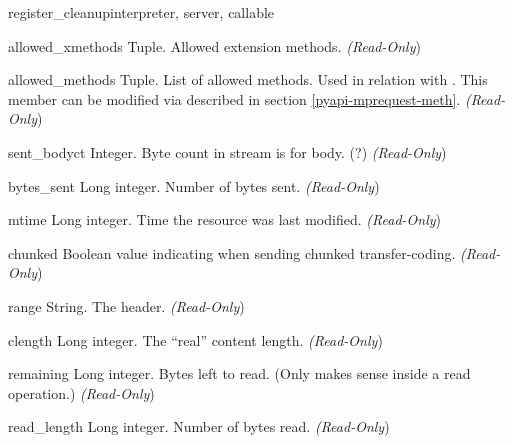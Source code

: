 \begin{funcdesc}{register_cleanup}{interpreter, server, callable}
\begin{memberdesc}[request]{allowed_xmethods}
  Tuple. Allowed extension methods.
  \emph{(Read-Only})
\end{memberdesc}

\begin{memberdesc}[request]{allowed_methods}
  Tuple. List of allowed methods. Used in relation with
  . This member can be modified via  
  described in section \ref{pyapi-mprequest-meth}.
  \emph{(Read-Only})
\end{memberdesc}

\begin{memberdesc}[request]{sent_bodyct}
  Integer. Byte count in stream is for body. (?)
  \emph{(Read-Only})
\end{memberdesc}

\begin{memberdesc}[request]{bytes_sent}
  Long integer. Number of bytes sent.
  \emph{(Read-Only})
\end{memberdesc}

\begin{memberdesc}[request]{mtime}
  Long integer. Time the resource was last modified.
  \emph{(Read-Only})
\end{memberdesc}

\begin{memberdesc}[request]{chunked}
  Boolean value indicating when sending chunked transfer-coding.
  \emph{(Read-Only})
\end{memberdesc}

\begin{memberdesc}[request]{range}
  String. The  header.
  \emph{(Read-Only})
\end{memberdesc}

\begin{memberdesc}[request]{clength}
  Long integer. The ``real'' content length.
  \emph{(Read-Only})
\end{memberdesc}

\begin{memberdesc}[request]{remaining}
  Long integer. Bytes left to read. (Only makes sense inside a read
  operation.)
  \emph{(Read-Only})
\end{memberdesc}

\begin{memberdesc}[request]{read_length}
  Long integer. Number of bytes read.
  \emph{(Read-Only})
\end{memberdesc}


\end{funcdesc}
